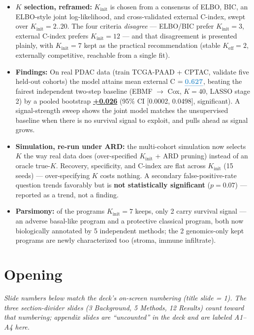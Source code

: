 \documentclass[11pt]{article}
\newcommand{\sectionlabel}[1]{\textbf{#1}}
\newcommand{\key}[1]{\textcolor{keyblue}{\textbf{#1}}}        %
\newcommand{\num}[1]{\textcolor{keycar}{\textbf{\uline{#1}}}} %
\begin{document}
\begin{itemize}
\item \sectionlabel{$K$ selection, reframed:} $K_\text{init}$ is chosen from a consensus of ELBO,
BIC, an ELBO-style joint log-likelihood, and cross-validated external C-index, swept over
$K_\text{init}=2..20$. The four criteria \emph{disagree} --- ELBO/BIC prefer $K_\text{init}=3$,
external C-index prefers $K_\text{init}=12$ --- and that disagreement is presented plainly, with
$K_\text{init}=7$ kept as the practical recommendation (stable $K_\text{eff}=2$, externally
competitive, reachable from a single fit).
\item \sectionlabel{Findings:} On real PDAC data (train TCGA-PAAD + CPTAC, validate five held-out
cohorts) the model attains mean external C $= \num{0.627}$, beating the fairest independent two-step
baseline (EBMF $\to$ Cox, $K=40$, LASSO stage 2) by a pooled bootstrap
\num{+0.026} (95\% CI [0.0002, 0.0498], significant). A signal-strength sweep shows the joint model
matches the unsupervised baseline when there is no survival signal to exploit, and pulls ahead as
signal grows.
\item \sectionlabel{Simulation, re-run under ARD:} the multi-cohort simulation now selects $K$ the way
real data does (over-specified $K_\text{init}$ + ARD pruning) instead of an oracle true-$K$.
Recovery, specificity, and C-index are flat across $K_\text{init}$ (15 seeds) --- over-specifying $K$
costs nothing. A secondary false-positive-rate question trends favorably but is \key{not
statistically significant} ($p=0.07$) --- reported as a trend, not a finding.
\item \sectionlabel{Parsimony:} of the programs $K_\text{init}=7$ keeps, only 2 carry survival signal
--- an adverse basal-like program and a protective classical program, both now biologically annotated
by 5 independent methods; the 2 genomics-only kept programs are newly characterized too (stroma,
immune infiltrate).
\end{itemize}

\section*{Opening}

\noindent\emph{Slide numbers below match the deck's on-screen numbering (title slide = 1). The three
section-divider slides (3 Background, 5 Methods, 12 Results) count toward that numbering; appendix
slides are ``uncounted'' in the deck and are labeled A1--A4 here.}
\end{document}
